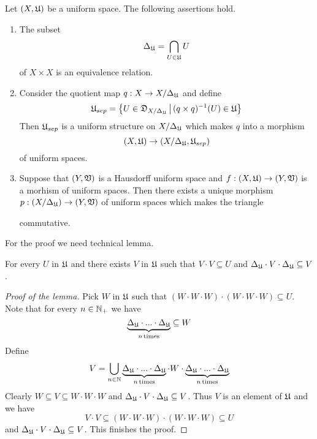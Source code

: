 \begin{theorem}\label{theorem:universal_Hausdorff_quotient}
Let $(X,{\mathfrak U})$ be a uniform space. The following assertions hold.
\begin{enumerate}[label=\emph{\textbf{(\arabic*)}}, leftmargin=*]
\item The subset
$$\Delta_{{\mathfrak U}} = \bigcap_{U\in {\mathfrak U}}U$$
of $X\times X$ is an equivalence relation.
\item Consider the quotient map $q:X\rightarrow X/\Delta_{{\mathfrak U}}$ and define 
$${\mathfrak U}_{sep} = \big\{U \in {\mathfrak D}_{X/\Delta_{{\mathfrak U}}}\,\big|\,(q\times q)^{-1}(U) \in {\mathfrak U}\big\}$$
Then ${\mathfrak U}_{sep}$ is a uniform structure on $X/\Delta_{{\mathfrak U}}$ which makes $q$ into a morphism 
$$\left(X,{\mathfrak U}\right)\rightarrow \left(X/\Delta_{{\mathfrak U}},{\mathfrak U}_{sep}\right)$$
of uniform spaces.
\item Suppose that $\left(Y,{\mathfrak V}\right)$ is a Hausdorff uniform space and $f:\left(X,{\mathfrak U}\right)\rightarrow \left(Y,{\mathfrak V}\right)$ is a morhism of uniform spaces. Then there exists a unique morphism $p:\left(X/\Delta_{{\mathfrak U}}\right)\rightarrow \left(Y,{\mathfrak V}\right)$ of uniform spaces which makes the triangle
\begin{center}
\end{center}
commutative.
\end{enumerate}
\end{theorem}
\noindent
For the proof we need technical lemma.

\begin{lemma}\label{lemma:entourage_closed_under_pseudodiagonal}
For every $U$ in ${\mathfrak U}$ and there exists $V$ in ${\mathfrak U}$ such that $V\cdot V\subseteq U$ and $\Delta_{{\mathfrak U}}\cdot V\cdot \Delta_{{\mathfrak U}}\subseteq V$.
\end{lemma}
\begin{proof}[Proof of the lemma]
Pick $W$ in ${\mathfrak U}$ such that $\left(W\cdot W\cdot W\right) \cdot \left(W \cdot W \cdot W\right) \subseteq U$. Note that for every $n\in {\mathbb N}_+$ we have 
$$\underbrace{\Delta_{{\mathfrak U}}\cdot ...\cdot \Delta_{{\mathfrak U}}}_{n\,\mathrm{times}}\subseteq W$$
Define
$$V = \bigcup_{n\in {\mathbb N}}\underbrace{\Delta_{{\mathfrak U}}\cdot ...\cdot \Delta_{{\mathfrak U}}}_{n\,\mathrm{times}}\cdot W\cdot \underbrace{\Delta_{{\mathfrak U}}\cdot ...\cdot \Delta_{{\mathfrak U}}}_{n\,\mathrm{times}}$$
Clearly $W\subseteq V \subseteq W\cdot W\cdot W$ and $\Delta_{{\mathfrak U}}\cdot V\cdot \Delta_{{\mathfrak U}}\subseteq V$. Thus $V$ is an element of ${\mathfrak U}$ and we have
$$V\cdot V\subseteq \left(W\cdot W\cdot W\right) \cdot \left(W \cdot W \cdot W\right) \subseteq U$$
and $\Delta_{{\mathfrak U}}\cdot V\cdot \Delta_{{\mathfrak U}}\subseteq V$. This finishes the proof.
\end{proof}


